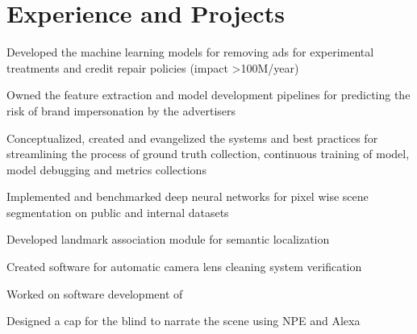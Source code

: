 \documentclass[]{resume-openfont}
\begin{document}
\begin{minipage}[t]{0.63\textwidth} 


\section{Experience and Projects}

\vspace{\topsep} %
\begin{tightemize}
\item Developed the machine learning models for removing ads for experimental treatments and credit repair policies (impact >100M/year)
\item Owned the feature extraction and model development pipelines for predicting the risk of brand impersonation by the advertisers
\item Conceptualized, created and evangelized the systems and best practices for streamlining the process of ground truth collection, continuous training of model, model debugging and metrics collections
\end{tightemize}
\sectionsep

\begin{tightemize}
\item Implemented and benchmarked deep neural networks for pixel wise scene segmentation on public and internal datasets
\item Developed landmark association module for semantic localization
\item Created software for automatic camera lens cleaning system verification
\end{tightemize}
\sectionsep

\begin{tightemize}
\item  Worked on software development of  \href{https://developer.qualcomm.com/software/snapdragon-neural-processing-engine}{}
\item Designed a cap for the blind to narrate the scene using NPE and Alexa


\end{tightemize}
\end{minipage}
\end{document}
